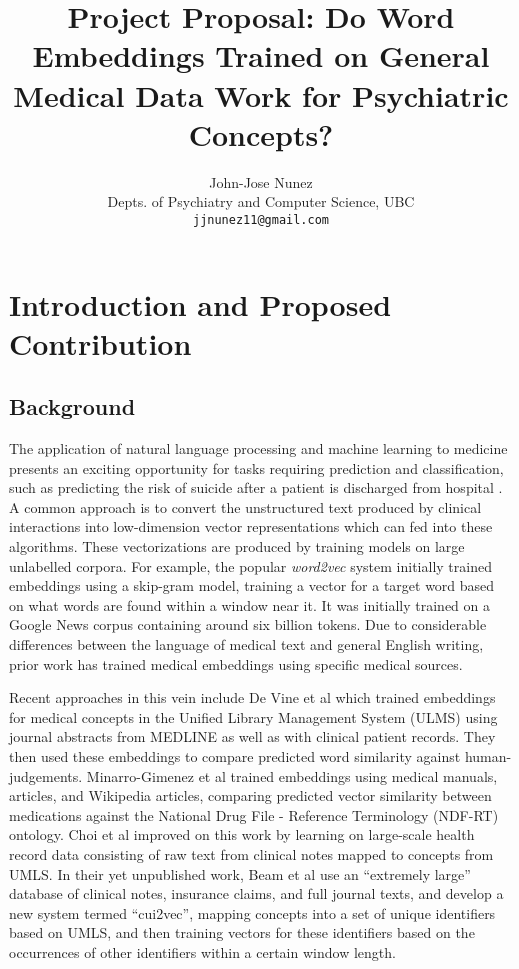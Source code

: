 \documentclass[10pt]{article}
\title{Project Proposal: Do Word Embeddings Trained on General Medical Data Work for Psychiatric Concepts?}
\author{John-Jose Nunez\\
  Depts. of Psychiatry and Computer Science, UBC\\
  {\tt jjnunez11@gmail.com} 
}
\date{}
\begin{document}
\maketitle

\section{Introduction and Proposed Contribution}

\subsection{Background}

The application of natural language processing and machine learning to medicine presents an exciting opportunity for tasks requiring prediction and classification, such as predicting the risk of suicide after a patient is discharged from hospital \cite{mccoyImprovingPredictionSuicide2016}. A common approach is to convert the unstructured text produced by clinical interactions into low-dimension vector representations which can fed into these algorithms. These vectorizations are produced by training models on large unlabelled corpora. For example, the popular \emph{word2vec} system \cite{mikolovEfficientEstimationWord2013} initially trained embeddings using a skip-gram model, training a vector for a target word based on what words are found within a window near it. It was initially trained on a Google News corpus containing around six billion tokens. Due to considerable differences between the language of medical text and general English writing, prior work has trained medical embeddings using specific medical sources. 

Recent approaches in this vein include De Vine et al  which trained embeddings for medical concepts in the Unified Library Management System (ULMS) \cite{bodenreiderUnifiedMedicalLanguage2004} using journal abstracts from MEDLINE as well as with clinical patient records. They then used these embeddings to compare predicted word similarity against human-judgements. Minarro-Gimenez et al  trained embeddings using medical manuals, articles, and Wikipedia articles, comparing predicted vector similarity between medications against the National Drug File - Reference Terminology (NDF-RT) ontology. Choi et al \cite{choiLearningLowDimensionalRepresentations2016} improved on this work by learning on large-scale health record data consisting of raw text from clinical notes mapped to concepts from UMLS. In their yet unpublished work, Beam et al \cite{beamClinicalConceptEmbeddings2018} use an ``extremely large'' database of clinical notes, insurance claims, and full journal texts, and develop a new system termed ``cui2vec'', mapping concepts into a set of unique identifiers based on UMLS, and then training vectors for these identifiers based on the occurrences of other identifiers within a certain window length. 
\end{document}
